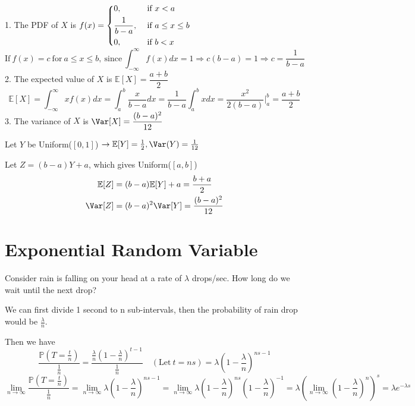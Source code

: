 1. The PDF of \(X\) is \(f(x) = \begin{dcases}
        0, &\text{ if } x < a \\
        \frac{1}{b - a}, &\text{ if } a \leq x \leq b \\
        0 , &\text{ if } b < x
    \end{dcases}\) 
    \[
        \text{If}\ f(x) = c\ \text{for}\ a \leq x \leq b,\ \text{since}\ \int_{-\infty} ^{\infty} f(x)dx = 1 \Rightarrow c(b - a) = 1 \Rightarrow c = \frac{1}{b - a}
    \]
2. The expected value of \(X\) is \(\mathbb{E}[X] = \dfrac{a + b}{2}\)
    \[
        \mathbb{E}[X] = \int_{-\infty} ^{\infty} xf(x)dx = \int_{a} ^{b} \dfrac{x}{b - a}dx = \dfrac{1}{b - a}\int_{a} ^{b} xdx = \dfrac{x^2}{2(b - a)} \Big|_a^b = \dfrac{a + b}{2}
    \]
3. The variance of \(X\) is \(\Var[X] = \dfrac{(b - a)^2}{12}\)
    
    Let \(Y\) be Uniform(\([0, 1]\)) \(\rightarrow \mathbb{E}[Y] = \frac{1}{2}, \Var(Y) = \frac{1}{12}\) 

    Let \(Z = (b - a)Y + a\), which gives Uniform(\([a, b]\)) 
    \[
    \begin{aligned}
        \mathbb{E}[Z] &= (b - a)\mathbb{E}[Y] + a = \dfrac{b + a}{2} \\
        \Var[Z] &= (b - a)^2 \Var[Y] = \dfrac{(b - a)^2}{12}
    \end{aligned}
    \]

\section{Exponential Random Variable}

Consider rain is falling on your head at a rate of \(\lambda\) drops/sec. How long do we wait until the next drop?

We can first divide 1 second to n sub-intervals, then the probability of rain drop would be \(\frac{\lambda}{n}\). 

Then we have 
\[
    \dfrac{\mathbb{P}(T = \frac{t}{n})}{\frac{1}{n}} = \frac{\frac{\lambda}{n}\left(1 - \frac{\lambda}{n}\right)^{t-1}}{\frac{1}{n}} \quad(\text{Let}\ t = ns) = \lambda\left(1 - \dfrac{\lambda}{n}\right)^{ns-1}
\]
\[
    \lim_{n \to \infty} \dfrac{\mathbb{P}(T = \frac{t}{n})}{\frac{1}{n}} = \lim_{n \to \infty} \lambda\left(1 - \dfrac{\lambda}{n}\right)^{ns-1} = \lim_{n \to \infty} \lambda\left(1 - \dfrac{\lambda}{n}\right)^{ns}\left(1 - \dfrac{\lambda}{n}\right)^{-1} = \lambda \left(\lim_{n \to \infty} \left(1 - \dfrac{\lambda}{n}\right)^n\right)^s = \lambda e^{-\lambda s}
\]

